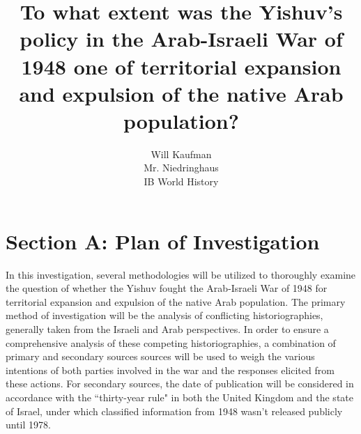 \documentclass[12pt]{turabian-researchpaper}
\begin{document}
\title{To what extent was the Yishuv's policy in the Arab-Israeli War of 1948 one of territorial expansion and expulsion of the native Arab population?}



\author{Will Kaufman \\ Mr. Niedringhaus \\ IB World History}
\maketitle



\section{Section A: Plan of Investigation}
In this investigation, several methodologies will be utilized to thoroughly examine the question of whether the Yishuv fought the Arab-Israeli War of 1948 for territorial expansion and expulsion of the native Arab population.  The primary method of investigation will be the analysis of conflicting historiographies, generally taken from the Israeli and Arab perspectives.  In order to ensure a comprehensive analysis of these competing historiographies, a combination of primary and secondary sources sources will be used to weigh the various intentions of both parties involved in the war and the responses elicited from these actions.  For secondary sources, the date of publication will be considered in accordance with the ``thirty-year rule" in both the United Kingdom and the state of Israel, under which classified information from 1948 wasn’t released publicly until 1978.

\end{document}
